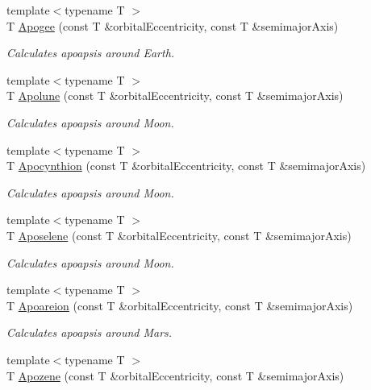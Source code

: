 \begin{DoxyCompactItemize}
{\footnotesize template$<$typename T $>$ }\\T \hyperlink{group___apoapsis_ga5cf587a051db28cae9e028a2b4955b0d}{Apogee} (const T \&orbital\+Eccentricity, const T \&semimajor\+Axis)
\begin{DoxyCompactList}\small\item\em Calculates apoapsis around Earth. \end{DoxyCompactList}\item 
{\footnotesize template$<$typename T $>$ }\\T \hyperlink{group___apoapsis_gacc68b49812c38394611e1ef3a8bf0e3e}{Apolune} (const T \&orbital\+Eccentricity, const T \&semimajor\+Axis)
\begin{DoxyCompactList}\small\item\em Calculates apoapsis around Moon. \end{DoxyCompactList}\item 
{\footnotesize template$<$typename T $>$ }\\T \hyperlink{group___apoapsis_ga557bb4d1a0ce7f17aaa8f8de469d4f52}{Apocynthion} (const T \&orbital\+Eccentricity, const T \&semimajor\+Axis)
\begin{DoxyCompactList}\small\item\em Calculates apoapsis around Moon. \end{DoxyCompactList}\item 
{\footnotesize template$<$typename T $>$ }\\T \hyperlink{group___apoapsis_gab61f3b2d6a5be3f62f5fb6dfdf802014}{Aposelene} (const T \&orbital\+Eccentricity, const T \&semimajor\+Axis)
\begin{DoxyCompactList}\small\item\em Calculates apoapsis around Moon. \end{DoxyCompactList}\item 
{\footnotesize template$<$typename T $>$ }\\T \hyperlink{group___apoapsis_ga8d8ac5814f653e229e1d463b432ffca5}{Apoareion} (const T \&orbital\+Eccentricity, const T \&semimajor\+Axis)
\begin{DoxyCompactList}\small\item\em Calculates apoapsis around Mars. \end{DoxyCompactList}\item 
{\footnotesize template$<$typename T $>$ }\\T \hyperlink{group___apoapsis_ga44d3dd8d8b350d053b25b7b1f1e15534}{Apozene} (const T \&orbital\+Eccentricity, const T \&semimajor\+Axis)

\end{DoxyCompactItemize}
